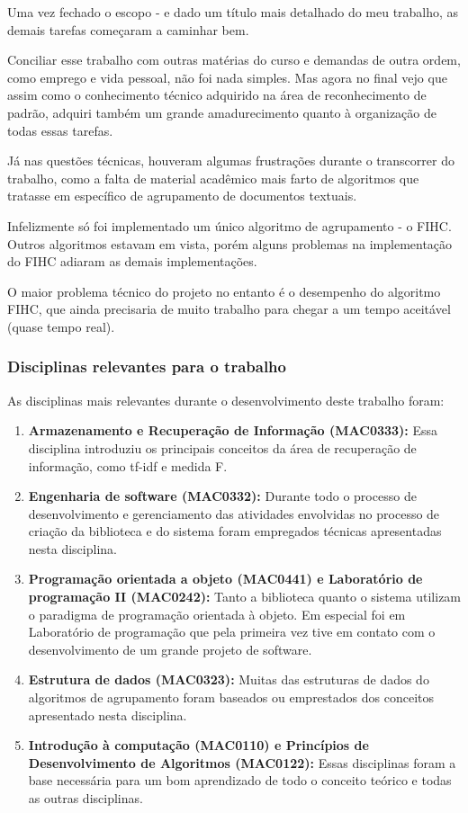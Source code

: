 \documentclass[a4paper,12pt]{article}
\begin{document}
Uma vez fechado o escopo - e dado um título mais detalhado do meu trabalho, as demais tarefas começaram a caminhar bem. 

Conciliar esse trabalho com outras matérias do curso e demandas de outra ordem, como emprego e vida pessoal, não foi nada simples. Mas agora no final vejo que assim como o conhecimento técnico adquirido na área de reconhecimento de padrão, adquiri também um grande amadurecimento quanto à organização de todas essas tarefas.

Já nas questões técnicas, houveram algumas frustrações durante o transcorrer do trabalho, como a falta de material acadêmico mais farto de algoritmos que tratasse em específico de agrupamento de documentos textuais.

Infelizmente só foi implementado um único algoritmo de agrupamento - o FIHC. Outros algoritmos estavam em vista, porém alguns problemas na implementação do FIHC adiaram as demais implementações.

O maior problema técnico do projeto no entanto é o desempenho do algoritmo FIHC, que ainda precisaria de muito trabalho para chegar a um tempo aceitável (quase tempo real).

\subsubsection {Disciplinas relevantes para o trabalho}
\label {sec:disciplinas relevantes para o trabalho}

As disciplinas mais relevantes durante o desenvolvimento deste trabalho foram:
\begin{enumerate}
    \item \textbf{Armazenamento e Recuperação de Informação (MAC0333):} Essa disciplina introduziu os principais conceitos da área de recuperação de informação, como tf-idf e medida F.

    \item \textbf{Engenharia de software (MAC0332):} Durante todo o processo de desenvolvimento e gerenciamento das atividades envolvidas no processo de criação da biblioteca e do sistema foram empregados técnicas apresentadas nesta disciplina.

    \item \textbf{Programação orientada a objeto (MAC0441) e Laboratório de programação II (MAC0242):} Tanto a biblioteca quanto o sistema utilizam o paradigma de programação orientada à objeto. Em especial foi em Laboratório de programação que pela primeira vez tive em contato com o desenvolvimento de um grande projeto de software.

    \item \textbf{Estrutura de dados (MAC0323):} Muitas das estruturas de dados do algoritmos de agrupamento foram baseados ou emprestados dos conceitos apresentado nesta disciplina.

    \item \textbf{Introdução à computação (MAC0110) e Princípios de Desenvolvimento de Algoritmos (MAC0122):} Essas disciplinas foram a base necessária para um bom aprendizado de todo o conceito teórico e todas as outras disciplinas.
\end {enumerate}
\end{document}
